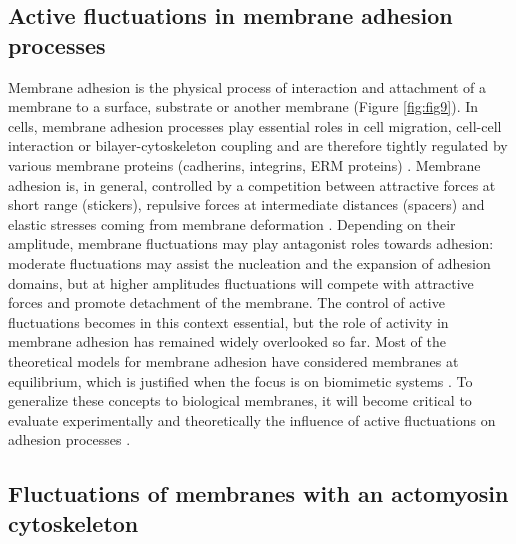 \documentclass[graybox]{svmult}
\begin{document}
		\subsection{Active fluctuations in membrane adhesion processes}
		
Membrane adhesion is the physical process of interaction and attachment of a membrane to a surface, substrate or another membrane (Figure \ref{fig:fig9}). In cells, membrane adhesion processes play essential roles in cell migration, cell-cell interaction or bilayer-cytoskeleton coupling and are therefore tightly regulated by various membrane proteins (cadherins, integrins, ERM proteins) \cite{Sackmann:2014}. Membrane adhesion is, in general, controlled by a competition between attractive forces at short range (stickers), repulsive forces at intermediate distances (spacers) and elastic stresses coming from membrane deformation \cite{Bell:1988, Evans:1985}.
Depending on their amplitude, membrane fluctuations may play antagonist roles towards adhesion: moderate fluctuations may assist the nucleation \cite{Bihr:2012} and the expansion of adhesion domains, but at higher amplitudes fluctuations will compete with attractive forces and promote detachment of the membrane. The control of active fluctuations becomes in this context essential, but the role of activity in membrane adhesion has remained widely overlooked so far. Most of the theoretical models for membrane adhesion have considered membranes at equilibrium, which is justified when the focus is on biomimetic systems \cite{Bruinsma:2000, Bihr:2012}. To generalize these concepts to biological membranes, it will become critical to evaluate experimentally and theoretically the influence of active fluctuations on adhesion processes \cite{Weikl:2009}.

		\subsection{Fluctuations of membranes with an actomyosin cytoskeleton}
\end{document}
